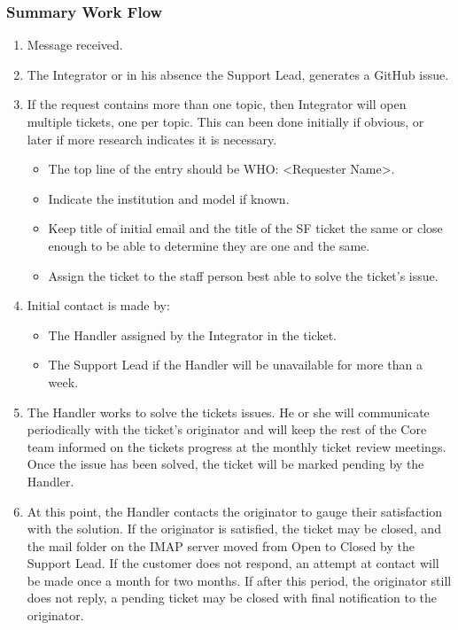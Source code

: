 \subsubsection{Summary Work Flow}
\begin{enumerate}
\item Message received.
\item The Integrator or in his absence the Support Lead, generates a GitHub issue.
\item If the request contains more than one topic, then Integrator will open multiple tickets, one per topic. This can been done initially if obvious, or later if more research indicates it is necessary. 
   \begin{itemize}
   \item The top line of the entry should be WHO: <Requester Name>.
   \item Indicate the institution and model if known.
   \item Keep title of initial email and the title of the SF ticket the
same or close enough to be able to determine they are one and the same.
   \item Assign the ticket to the staff person best able to solve the ticket's issue. 
   \end{itemize}

\item Initial contact is made by:

\begin{itemize}
\item The Handler assigned by the Integrator in the ticket. 
\item The Support Lead if the Handler will be unavailable for more than a week. 
\end{itemize}

\item The Handler works to solve the tickets issues. He or she will communicate 
periodically with the ticket's originator and will keep the rest of the Core team 
informed on the tickets progress at the monthly ticket review meetings.  Once the 
issue has been solved, the ticket will be marked pending by the Handler.  

\item At this point, the Handler contacts the originator to gauge their satisfaction with
the solution. If the originator is satisfied, the ticket may be closed, and the mail 
folder on the IMAP server moved from Open to Closed by the Support Lead.  If the customer
does not respond, an attempt at contact will be made once a month for two months. 
If after this period, the originator still does not reply, a pending ticket may be closed
with final notification to the originator.   
\end{enumerate}


